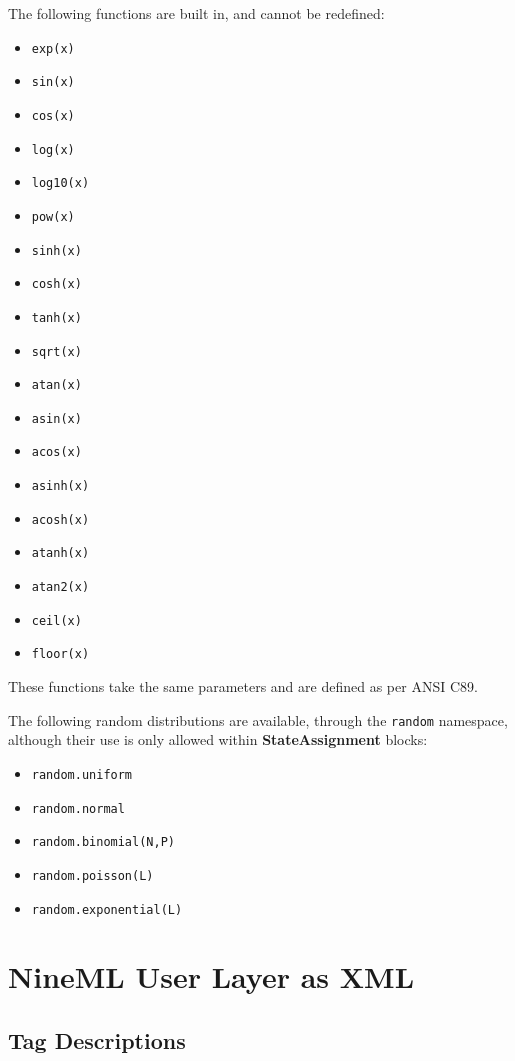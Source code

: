 \documentclass{article}
\newcommand{\StateAssignment}{{\bf{StateAssignment}}\xspace}
\begin{document}
The following functions are built in, and cannot be redefined:
\begin{itemize}
\item \verb|exp(x)|
\item \verb|sin(x)|
\item \verb|cos(x)|
\item \verb|log(x)|
\item \verb|log10(x)|
\item \verb|pow(x)|
\item \verb|sinh(x)|
\item \verb|cosh(x)|
\item \verb|tanh(x)|
\item \verb|sqrt(x)|
\item \verb|atan(x)|
\item \verb|asin(x)|
\item \verb|acos(x)|
\item \verb|asinh(x)|
\item \verb|acosh(x)|
\item \verb|atanh(x)|
\item \verb|atan2(x)|
\item \verb|ceil(x)|
\item \verb|floor(x)|
\end{itemize}

These functions take the same parameters and are defined as per ANSI C89.

The following random distributions are available, through the \verb|random|
namespace,
although their use is only allowed within \StateAssignment blocks:

\begin{itemize}
\item \verb|random.uniform|
\item \verb|random.normal|
\item \verb|random.binomial(N,P)|
\item \verb|random.poisson(L)|
\item \verb|random.exponential(L)|
\end{itemize}

\pagebreak

\section{NineML User Layer as XML}

\subsection{Tag Descriptions}
\end{document}
